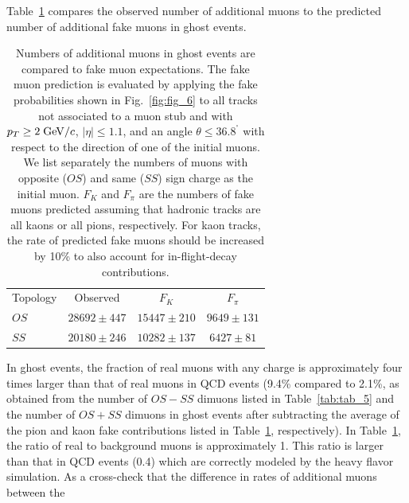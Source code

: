 \documentclass[aps,prd,preprint,floatfix,nofootinbib,superscriptaddress,showpacs,amssymb]{revtex4}
\def\deg{^\circ}
\begin{document}
  Table~\ref{tab:tab_7} compares the observed number of additional muons 
  to the predicted number of additional fake muons in ghost events.
 \begin{table}
 \caption[]{Numbers of additional muons in ghost events are compared to fake
            muon expectations. The fake muon prediction is evaluated by 
            applying the fake probabilities shown in Fig.~\ref{fig:fig_6} to
            all tracks not associated to a muon stub and with 
            $p_T \geq 2 \; {\rm GeV/}c$, $|\eta| \leq 1.1$, and an angle 
            $\theta \leq 36.8^{\deg}$ with respect to the direction of one of
            the initial muons. We list separately the numbers of muons with
            opposite ($OS$) and same ($SS$)
            sign charge as the initial muon. $F_K$ and $F_\pi$ are the numbers
            of fake muons predicted assuming that hadronic tracks are all kaons
            or all pions, respectively. For kaon tracks, the rate of predicted
            fake muons should be increased by 10\% to also account for 
            in-flight-decay contributions. }
 \begin{center}
 \begin{ruledtabular}
 \begin{tabular}{lccc}
  Topology &  Observed         &     $F_K$        &      $F_\pi$    \\
  $OS$     &  $28692 \pm 447$  & $15447 \pm 210$  &  $9649 \pm 131$ \\
  $SS$     &  $20180 \pm 246$  & $10282 \pm 137$  &  $6427 \pm  81$ \\
 \end{tabular}
 \end{ruledtabular}
 \end{center}
 \label{tab:tab_7}
 \end{table} 
 In ghost events, the fraction of real  muons with any charge is
 approximately four times larger than that of real muons in QCD events
 (9.4\% compared to 2.1\%, as obtained from the number of $OS-SS$ 
 dimuons listed in Table~\ref{tab:tab_5} and the number of $OS+SS$
 dimuons in ghost events after subtracting the average of the pion
 and kaon fake contributions listed in Table~\ref{tab:tab_7},
 respectively). In Table~\ref{tab:tab_7}, the ratio of real to background
 muons is approximately 1. This ratio is larger than that in
 QCD events (0.4) which are correctly modeled by the heavy flavor simulation.
As a cross-check that the difference in rates of additional muons between the
\end{document}
